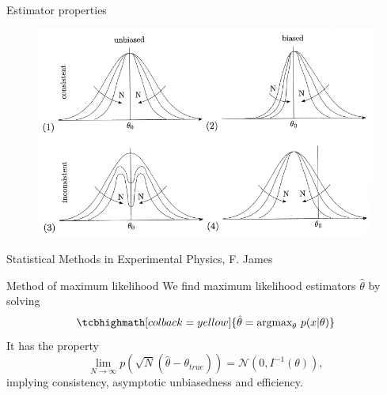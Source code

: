 \documentclass[
aspectratio=169,
14pt,
professionalfonts
]{beamer}
\begin{document}
\begin{frame}{Estimator properties}
    \vspace{-0.5cm}
    \begin{figure}
    \centering
    \includegraphics[width=0.75\linewidth]{../plots/estimator.pdf}
\end{figure}
\begin{flushright}
    \small
    Statistical Methods in Experimental Physics, F. James
\end{flushright}
\end{frame}

\begin{frame}{Method of maximum likelihood}
    \vspace{-0.2cm}
    We find maximum likelihood estimators $ \hat \theta$ by solving
    $$
    \tcbhighmath[colback=yellow]{
        \hat \theta = \text{argmax}_\theta ~ p(x|\theta)
    }
    $$
    It has the property
    $$
    \lim_{N \to \infty} p\left(\sqrt{N}(\hat \theta - \theta_{true})\right) = \mathcal{N}\left(0, I^{-1}(\theta)\right),
    $$
    implying consistency, asymptotic unbiasedness and efficiency.
\end{frame}

\end{document}
